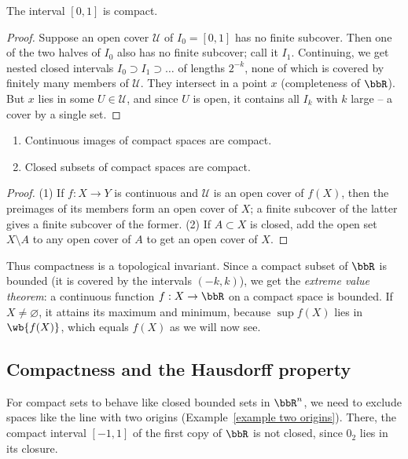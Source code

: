 \begin{thm}\label{thm interval compact}
    The interval $[0,1]$ is compact.
\end{thm}
\begin{proof}
    Suppose an open cover $\mathscr{U}$ of $I_0=[0,1]$ has no finite subcover. Then one of the two halves of $I_0$ also has no finite subcover; call it $I_1$. Continuing, we get nested closed intervals $I_0\supset I_1\supset\ldots$ of lengths $2^{-k}$, none of which is covered by finitely many members of $\mathscr{U}$. They intersect in a point $x$ (completeness of $\bbR$). But $x$ lies in some $U\in\mathscr{U}$, and since $U$ is open, it contains all $I_k$ with $k$ large -- a cover by a single set.
\end{proof}

\begin{prop}\label{prop f(compact)=compact}
    \begin{enumerate}
        \item Continuous images of compact spaces are compact.
        \item Closed subsets of compact spaces are compact.
    \end{enumerate}
\end{prop}
\begin{proof}
    (1) If $f:X\to Y$ is continuous and $\mathscr{U}$ is an open cover of $f(X)$, then the preimages of its members form an open cover of $X$; a finite subcover of the latter gives a finite subcover of the former. (2) If $A\subset X$ is closed, add the open set $X\setminus A$ to any open cover of $A$ to get an open cover of $X$.
\end{proof}

Thus compactness is a topological invariant. Since a compact subset of $\bbR$ is bounded (it is covered by the intervals $(-k,k)$), we get the \emph{extreme value theorem}: a continuous function $f:X\to\bbR$ on a compact space is bounded. If $X\neq\varnothing$, it attains its maximum and minimum, because $\sup f(X)$ lies in $\wb{f(X)}$, which equals $f(X)$ as we will now see.

\subsection{Compactness and the Hausdorff property}

For compact sets to behave like closed bounded sets in $\bbR^n$, we need to exclude spaces like the line with two origins (Example~\ref{example two origins}). There, the compact interval $[-1,1]$ of the first copy of $\bbR$ is not closed, since $0_2$ lies in its closure.

